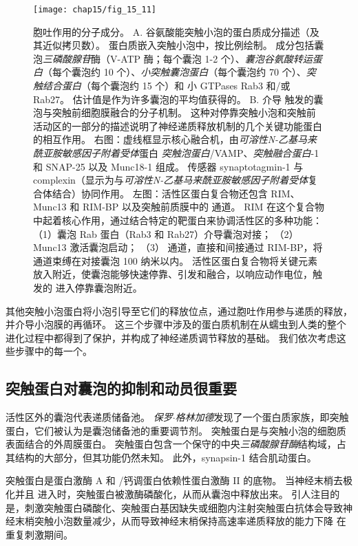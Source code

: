 \begin{figure}[htbp]
	\centering
	\texttt{[image: chap15/fig\_15\_11]}
	\caption{胞吐作用的分子成分。
		A. 谷氨酸能突触小泡的蛋白质成分描述（及其近似拷贝数）。
		蛋白质嵌入突触小泡中，按比例绘制。
		成分包括囊泡\textit{三磷酸腺苷}酶（V-ATP 酶；每个囊泡 1-2 个）、\textit{囊泡谷氨酸转运蛋白}（每个囊泡约 10 个）、\textit{小突触囊泡蛋白}（每个囊泡约 70 个）、\textit{突触结合蛋白}（每个囊泡约 15 个）和 小 GTPases Rab3 和/或 Rab27。
		估计值是作为许多囊泡的平均值获得的\cite{takamori2006molecular}。
		B. 介导  触发的囊泡与突触前细胞膜融合的分子机制。
		这种对停靠突触小泡和突触前活动区的一部分的描述说明了神经递质释放机制的几个关键功能蛋白的相互作用。
		右图：虚线框显示核心融合机，由\textit{可溶性N-乙基马来酰亚胺敏感因子附着受体}蛋白 \textit{突触泡蛋白}/VAMP、\textit{突触融合蛋白}-1 和 SNAP-25 以及 Munc18-1 组成。
		 传感器 synaptotagmin-1 与 complexin（显示为与\textit{可溶性N-乙基马来酰亚胺敏感因子附着受体}复合体结合）协同作用。
		左图：活性区蛋白复合物还包含 RIM、Munc13 和 RIM-BP 以及突触前质膜中的  通道。
		RIM 在这个复合物中起着核心作用，通过结合特定的靶蛋白来协调活性区的多种功能：
		（1）囊泡 Rab 蛋白（Rab3 和 Rab27）介导囊泡对接；
		（2）Munc13 激活囊泡启动；
		（3） 通道，直接和间接通过 RIM-BP，将  通道束缚在对接囊泡 100 纳米以内。
		活性区蛋白复合物将关键元素放入附近，使囊泡能够快速停靠、引发和融合，以响应动作电位，触发的 进入停靠囊泡附近\cite{sudhof2013neurotransmitter}。}
	\label{fig:15_11}
\end{figure}


其他突触小泡蛋白将小泡引导至它们的释放位点，通过胞吐作用参与递质的释放，并介导小泡膜的再循环。
这三个步骤中涉及的蛋白质机制在从蠕虫到人类的整个进化过程中都得到了保护，并构成了神经递质调节释放的基础。
我们依次考虑这些步骤中的每一个。



\subsection{突触蛋白对囊泡的抑制和动员很重要}

活性区外的囊泡代表递质储备池。
\textit{保罗$\cdot$格林加德}发现了一个蛋白质家族，即突触蛋白，它们被认为是囊泡储备池的重要调节剂。
突触蛋白是与突触小泡的细胞质表面结合的外周膜蛋白。
突触蛋白包含一个保守的中央\textit{三磷酸腺苷酶}结构域，占其结构的大部分，但其功能仍然未知。
此外，synapsin-1 结合肌动蛋白。


突触蛋白是蛋白激酶 A 和 /钙调蛋白依赖性蛋白激酶 II 的底物。
当神经末梢去极化并且  进入时，突触蛋白被激酶磷酸化，从而从囊泡中释放出来。
引人注目的是，刺激突触蛋白磷酸化、突触蛋白基因缺失或细胞内注射突触蛋白抗体会导致神经末梢突触小泡数量减少，从而导致神经末梢保持高速率递质释放的能力下降 在重复刺激期间。



